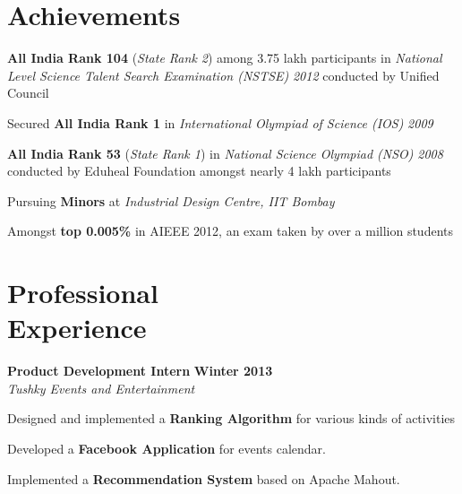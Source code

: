 \documentclass[margin,11pt]{resume}
\begin{document}
\begin{resume}
\vspace{70pt}
    \section{\mysidestyle Achievements}
   \begin{list2}
\item \textbf{All India Rank 104} (\textsl{State Rank 2}) among 3.75 lakh participants in \textsl{National Level Science Talent Search Examination (NSTSE)} \textsl{2012} conducted by Unified Council
\item Secured \textbf{All India Rank 1} in \textsl{International Olympiad of Science (IOS)} \textsl{2009}
\item \textbf{All India Rank 53} (\textsl{State Rank 1}) in \textsl{National Science Olympiad (NSO)} \textsl{2008} conducted by Eduheal Foundation amongst nearly 4 lakh participants
\item Pursuing \textbf{Minors} at \textsl{Industrial Design Centre, IIT Bombay}
\item Amongst \textbf{top 0.005\%} in AIEEE 2012, an exam taken by over a million students


 \end{list2}
 
    \section{\mysidestyle Professional \\ Experience}
\textbf{Product Development Intern} \hfill \textbf{Winter 2013}\\
\textsl{Tushky Events and Entertainment}
\begin{list2}
\item Designed and implemented a \textbf{Ranking Algorithm} for various kinds of activities
\item Developed a \textbf{Facebook Application} for events calendar.
\item Implemented a \textbf{Recommendation System} based on Apache Mahout.
\end{list2}
 
 
 

\end{resume}
\end{document}
